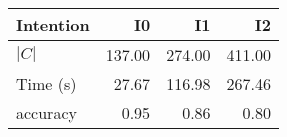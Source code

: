 \begin{tabular}{lrrr}
\toprule
Intention & I0 & I1 & I2 \\
\midrule
$|C|$ & 137.00 & 274.00 & 411.00 \\
Time (s) & 27.67 & 116.98 & 267.46 \\
accuracy & 0.95 & 0.86 & 0.80 \\
\bottomrule
\end{tabular}
